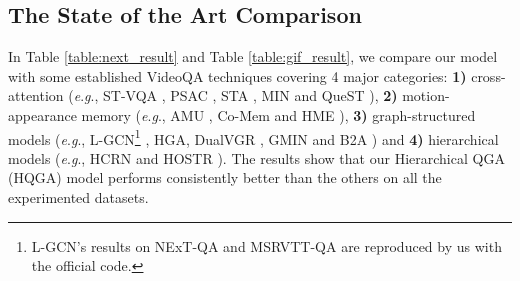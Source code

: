 \documentclass[letterpaper]{article} \usepackage{aaai21}  \usepackage{times}  \usepackage{helvet} \usepackage{courier}  \usepackage[hyphens]{url}  \usepackage{graphicx} \urlstyle{rm} \def\UrlFont{\rm}  \usepackage{natbib}  \usepackage{caption} \usepackage{color, colortbl}
\newcommand{\eg}{\textit{e}.\textit{g}.}
\begin{document}
\subsection{The State of the Art Comparison}
In Table \ref{table:next_result} and Table \ref{table:gif_result}, we compare our model with some established VideoQA techniques covering 4 major categories: \textbf{1)} cross-attention (\eg, ST-VQA \cite{jang2017}, PSAC \cite{li2019beyond}, STA \cite{gao2019structured}, MIN \cite{jin2019multi} and QueST \cite{jiang2020divide}), \textbf{2)} motion-appearance memory (\eg, AMU \cite{xu2017video}, Co-Mem \cite{gao2018motion} and HME \cite{fan2019heterogeneous}), \textbf{3)} graph-structured models (\eg, L-GCN\footnote{L-GCN's results on NExT-QA and MSRVTT-QA are reproduced by us with the official code.} \cite{huang2020location}, HGA\cite{jiang2020reasoning}, DualVGR \cite{wang2021dualvgr}, GMIN \cite{gu2021graph} and B2A \cite{park2021bridge}) and \textbf{4)} hierarchical models (\eg, HCRN \cite{le2020hierarchical} and HOSTR \cite{dang2021hierarchical}). The results show that our Hierarchical QGA (HQGA) model performs consistently better than the others on all the experimented datasets. 
\end{document}
